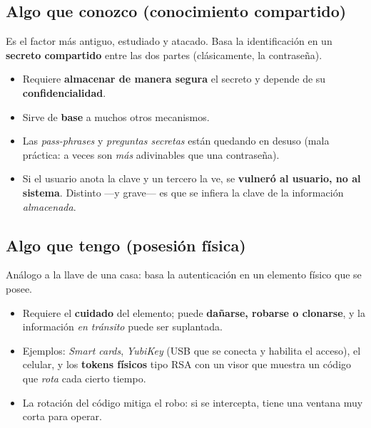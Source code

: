\documentclass[11pt,a4paper]{article}
\begin{document}
\subsection{Algo que conozco (conocimiento compartido)}
Es el factor más antiguo, estudiado y atacado. Basa la identificación en un \textbf{secreto
compartido} entre las dos partes (clásicamente, la contraseña).
\begin{itemize}[leftmargin=1.4em,itemsep=1pt]
  \item Requiere \textbf{almacenar de manera segura} el secreto y depende de su
        \textbf{confidencialidad}.
  \item Sirve de \textbf{base} a muchos otros mecanismos.
  \item Las \emph{pass-phrases} y \emph{preguntas secretas} están quedando en desuso (mala
        práctica: a veces son \emph{más} adivinables que una contraseña).
  \item Si el usuario anota la clave y un tercero la ve, se \textbf{vulneró al usuario, no al
        sistema}. Distinto —y grave— es que se infiera la clave de la información
        \emph{almacenada}.
\end{itemize}

\subsection{Algo que tengo (posesión física)}
Análogo a la llave de una casa: basa la autenticación en un elemento físico que se posee.
\begin{itemize}[leftmargin=1.4em,itemsep=1pt]
  \item Requiere el \textbf{cuidado} del elemento; puede \textbf{dañarse, robarse o
        clonarse}, y la información \emph{en tránsito} puede ser suplantada.
  \item Ejemplos: \emph{Smart cards}, \emph{YubiKey} (USB que se conecta y habilita el
        acceso), el celular, y los \textbf{tokens físicos} tipo RSA con un visor que muestra
        un código que \emph{rota} cada cierto tiempo.
  \item La rotación del código mitiga el robo: si se intercepta, tiene una ventana muy corta
        para operar.
\end{itemize}
\end{document}
